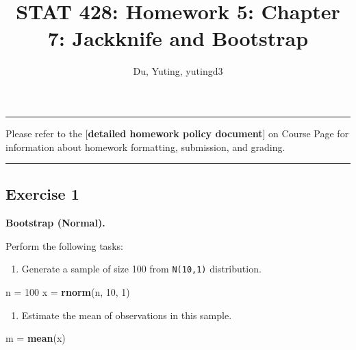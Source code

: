\documentclass[
]{article}
\title{STAT 428: Homework 5: Chapter 7: Jackknife and Bootstrap}
\author{Du, Yuting, yutingd3}
\date{}
\newenvironment{Shaded}{\begin{snugshade}}{\end{snugshade}}
\newcommand{\DecValTok}[1]{\textcolor[rgb]{0.00,0.00,0.81}{#1}}
\newcommand{\KeywordTok}[1]{\textcolor[rgb]{0.13,0.29,0.53}{\textbf{#1}}}
\newcommand{\NormalTok}[1]{#1}
\newcommand{\StringTok}[1]{\textcolor[rgb]{0.31,0.60,0.02}{#1}}
\providecommand{\tightlist}{%
  \setlength{\itemsep}{0pt}\setlength{\parskip}{0pt}}
\begin{document}
\maketitle

{
\setcounter{tocdepth}{2}
\tableofcontents
}
\begin{center}\rule{0.5\linewidth}{\linethickness}\end{center}

Please refer to the {[}\textbf{detailed homework policy document}{]} on
Course Page for information about homework formatting, submission, and
grading.

\begin{center}\rule{0.5\linewidth}{\linethickness}\end{center}

\hypertarget{exercise-1}{%
\subsection{Exercise 1}\label{exercise-1}}

\textbf{Bootstrap (Normal).}

Perform the following tasks:

\begin{enumerate}
\def\labelenumi{\arabic{enumi}.}
\tightlist
\item
  Generate a sample of size 100 from \texttt{N(10,1)} distribution.
\end{enumerate}

\begin{Shaded}
\begin{Highlighting}[]
\NormalTok{n =}\StringTok{ }\DecValTok{100}
\NormalTok{x =}\StringTok{ }\KeywordTok{rnorm}\NormalTok{(n, }\DecValTok{10}\NormalTok{, }\DecValTok{1}\NormalTok{)}
\end{Highlighting}
\end{Shaded}

\begin{enumerate}
\def\labelenumi{\arabic{enumi}.}
\setcounter{enumi}{1}
\tightlist
\item
  Estimate the mean of observations in this sample.
\end{enumerate}

\begin{Shaded}
\begin{Highlighting}[]
\NormalTok{m =}\StringTok{ }\KeywordTok{mean}\NormalTok{(x)}
\end{Highlighting}
\end{Shaded}
\end{document}
